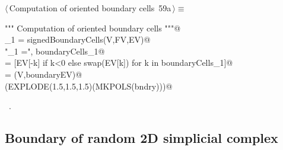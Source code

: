 \documentclass[11pt,oneside]{article}	%
\begin{document}
\begin{flushleft} \small \label{scrap112}
\protect{}$\langle\,$Computation of oriented boundary cells\nobreak\ {\footnotesize 59a}$\,\rangle\equiv$
\vspace{-1ex}
\begin{list}{}{} \item
\mbox{}\verb@"""  Computation of oriented boundary cells """@\\
\mbox{}\verb@boundaryCells_1 = signedBoundaryCells(V,FV,EV)@\\
\mbox{}\verb@print "\nboundaryCells_1 =\n", boundaryCells_1@\\
\mbox{}\verb@boundaryEV = [EV[-k] if k<0 else swap(EV[k]) for k in boundaryCells_1]@\\
\mbox{}\verb@bndry = (V,boundaryEV)@\\
\mbox{}\verb@VIEW(EXPLODE(1.5,1.5,1.5)(MKPOLS(bndry)))@\\
\mbox{}\verb@@{\NWsep}
\end{list}
\vspace{-1ex}
\footnotesize\addtolength{\baselineskip}{-1ex}
\begin{list}{}{\setlength{\itemsep}{-\parsep}\setlength{\itemindent}{-\leftmargin}}
\item \NWtxtMacroRefIn\ .
\end{list}
\end{flushleft}

\subsection{Boundary of random 2D simplicial complex}
\end{document}
